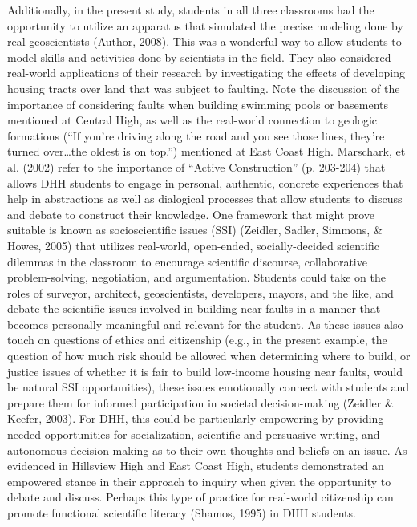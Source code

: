 \documentclass[11.5pt]{sig-alternate} %
\begin{document}
\begin{large}
Additionally, in the present study, students in all three classrooms had the opportunity to utilize an apparatus that simulated the precise modeling done by real geoscientists (Author, 2008).  This was a wonderful way to allow students to model skills and activities done by scientists in the field.  They also considered real-world applications of their research by investigating the effects of developing housing tracts over land that was subject to faulting.  Note the discussion of the importance of considering faults when building swimming pools or basements mentioned at Central High, as well as the real-world connection to geologic formations (“If you’re driving along the road and you see those lines, they’re turned over…the oldest is on top.”) mentioned at East Coast High. Marschark, et al. (2002) refer to the importance of “Active Construction” (p. 203-204) that allows DHH students to engage in personal, authentic, concrete experiences that help in abstractions as well as dialogical processes that allow students to discuss and debate to construct their knowledge.  One framework that might prove suitable is known as socioscientific issues (SSI) (Zeidler, Sadler, Simmons, \& Howes, 2005) that utilizes real-world, open-ended, socially-decided scientific dilemmas in the classroom to encourage scientific discourse, collaborative problem-solving, negotiation, and argumentation.  Students could take on the roles of surveyor, architect, geoscientists, developers, mayors, and the like, and debate the scientific issues involved in building near faults in a manner that becomes personally meaningful and relevant for the student.  As these issues also touch on questions of ethics and citizenship (e.g., in the present example, the question of how much risk should be allowed when determining where to build, or justice issues of whether it is fair to build low-income housing near faults, would be natural SSI opportunities), these issues emotionally connect with students and prepare them for informed participation in societal decision-making (Zeidler \& Keefer, 2003).  For DHH, this could be particularly empowering by providing needed opportunities for socialization, scientific and persuasive writing, and autonomous decision-making as to their own thoughts and beliefs on an issue.  As evidenced in Hillsview High and East Coast High, students demonstrated an empowered stance in their approach to inquiry when given the opportunity to debate and discuss.  Perhaps this type of practice for real-world citizenship can promote functional scientific literacy (Shamos, 1995) in DHH students. 


\end{large}
\end{document}
